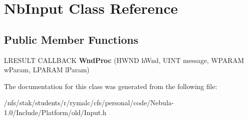 \hypertarget{classNbInput}{
\section{NbInput Class Reference}
\label{classNbInput}
}
\subsection*{Public Member Functions}
\begin{DoxyCompactItemize}
\item 
\hypertarget{classNbInput_ac7599bb29d8b931729b48f4e723f4430}{
LRESULT CALLBACK {\bfseries WndProc} (HWND hWnd, UINT message, WPARAM wParam, LPARAM lParam)}
\label{classNbInput_ac7599bb29d8b931729b48f4e723f4430}

\end{DoxyCompactItemize}


The documentation for this class was generated from the following file:\begin{DoxyCompactItemize}
\item 
/nfs/stak/students/r/rymalc/cfs/personal/code/Nebula-\/1.0/Include/Platform/old/Input.h\end{DoxyCompactItemize}
